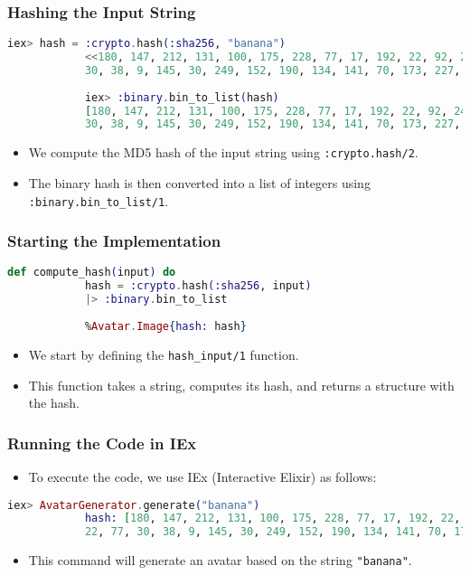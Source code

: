 \documentclass[aspectratio=169, table]{beamer}
\begin{document}
	\begin{frame}[fragile]
		\frametitle{Hashing the Input String}
		\begin{lstlisting}[language=Elixir]
			iex> hash = :crypto.hash(:sha256, "banana")
			<<180, 147, 212, 131, 100, 175, 228, 77, 17, 192, 22, 92, 244, 112, 164, 22, 77,
			30, 38, 9, 145, 30, 249, 152, 190, 134, 141, 70, 173, 227, 222, 78>>
			
			iex> :binary.bin_to_list(hash)
			[180, 147, 212, 131, 100, 175, 228, 77, 17, 192, 22, 92, 244, 112, 164, 22, 77,
			30, 38, 9, 145, 30, 249, 152, 190, 134, 141, 70, 173, 227, 222, 78]
		\end{lstlisting}
		\begin{itemize}
			\item We compute the MD5 hash of the input string using \texttt{:crypto.hash/2}.
			\item The binary hash is then converted into a list of integers using \texttt{:binary.bin\_to\_list/1}.
		\end{itemize}
	\end{frame}
	
	\begin{frame}[fragile]
		\frametitle{Starting the Implementation}
		\begin{lstlisting}[language=Elixir]
			def compute_hash(input) do
			hash = :crypto.hash(:sha256, input)
			|> :binary.bin_to_list
			
			%Avatar.Image{hash: hash}
		\end{lstlisting}
		\begin{itemize}
			\item We start by defining the \texttt{hash\_input/1} function.
			\item This function takes a string, computes its hash, and returns a structure with the hash.
		\end{itemize}
	\end{frame}
	
	\begin{frame}[fragile]
		\frametitle{Running the Code in IEx}
		\begin{itemize}
			\item To execute the code, we use IEx (Interactive Elixir) as follows:
		\end{itemize}
		\begin{lstlisting}[language=Elixir]
			iex> AvatarGenerator.generate("banana")
			hash: [180, 147, 212, 131, 100, 175, 228, 77, 17, 192, 22, 92, 244, 112, 164,
			22, 77, 30, 38, 9, 145, 30, 249, 152, 190, 134, 141, 70, 173, 227, 222, 78],
		\end{lstlisting}
		\begin{itemize}
			\item This command will generate an avatar based on the string \texttt{"banana"}.
		\end{itemize}
	\end{frame}
	
\end{document}
